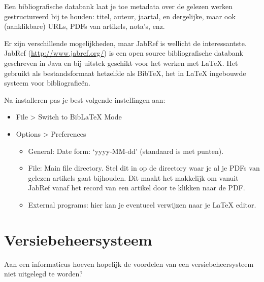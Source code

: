 Een bibliografische databank laat je toe metadata over de gelezen werken gestructureerd bij te houden: titel, auteur, jaartal, en dergelijke, maar ook (aanklikbare) URLs, PDFs van artikels, nota's, enz.

Er zijn verschillende mogelijkheden, maar JabRef is wellicht de interessantste. JabRef (\url{http://www.jabref.org/}) is een open source bibliografische databank geschreven in Java en bij uitstek geschikt voor het werken met {\LaTeX}. Het gebruikt als bestandsformaat hetzelfde als Bib{\TeX}, het in {\LaTeX} ingebouwde systeem voor bibliografieën.

Na installeren pas je best volgende instellingen aan:

\begin{itemize}
  \item File > Switch to BibLaTeX Mode
  \item Options > Preferences
    \begin{itemize}
      \item General: Date form: `yyyy-MM-dd' (standaard is met punten).
      \item File: Main file directory. Stel dit in op de directory waar je al je PDFs van gelezen artikels gaat bijhouden. Dit maakt het makkelijk om vanuit JabRef vanaf het record van een artikel door te klikken naar de PDF.
      \item External programs: hier kan je eventueel verwijzen naar je {\LaTeX} editor.
    \end{itemize}
\end{itemize}

\section{Versiebeheersysteem}
\label{sec:versiebeheersysteem}

Aan een informaticus hoeven hopelijk de voordelen van een versiebeheersysteem niet uitgelegd te worden?
%


